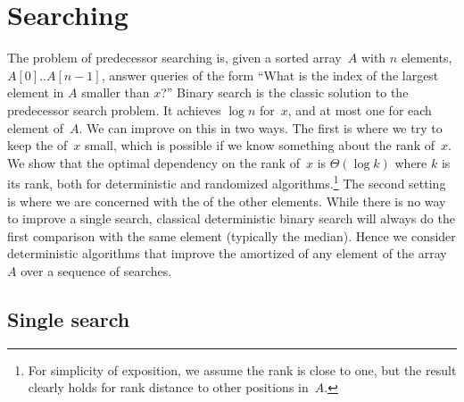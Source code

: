 
\newcommand{\lrp}[1]{\left( #1 \right)}
\newcommand{\lrc}[1]{\lceil #1 \rceil}

\section{Searching}
\label{sec:searching}

The problem of predecessor searching is, given a sorted array~$A$ with
$n$ elements, $A[0]..A[n-1]$, answer queries of the form ``What is the
index of the largest element in $A$ smaller than $x$?''  Binary search
is the classic solution to the predecessor search problem. It achieves
$\log n$ \frag for~$x$, and \frag at most one for each element of~$A$.
We can improve on this in two ways.  The first is where we try to keep
the \frag of~$x$ small, which is possible if we know something about
the rank of~$x$. We show that the optimal dependency on
the rank of~$x$ is $\Theta(\log k)$ where $k$ is its rank, both for deterministic and
randomized algorithms.\footnote{For simplicity of exposition, we assume the
  rank is close to one, but the result clearly holds for rank distance
  to other positions in~$A$.}
The second setting is where we are concerned with the
\frag of the other elements.  While there is no way to improve a
single search, classical deterministic binary search will always do
the first comparison with the same element (typically the median).
Hence we consider deterministic algorithms that improve the amortized
\frag of any element of the array~$A$ over a sequence of searches.

\subsection{Single search}

